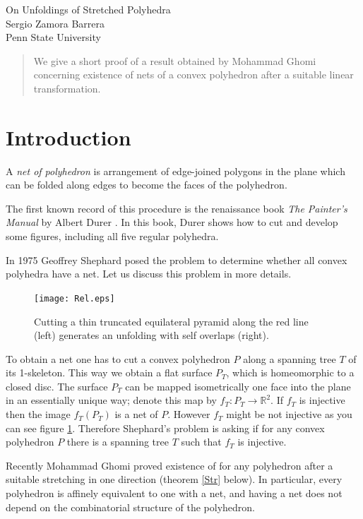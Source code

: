 \documentclass[openright, 12pt]{article}
\begin{document}
\begin{center}
\Large{On Unfoldings of Stretched Polyhedra}\\
\normalsize{ Sergio Zamora Barrera}\\
Penn State University
\end{center}



\begin{abstract}
\noindent We give a short proof of a result obtained by Mohammad Ghomi concerning existence of nets of a convex polyhedron after a suitable linear transformation.

\end{abstract}

\section{Introduction}

A \emph{net of polyhedron} is arrangement of edge-joined polygons in the plane which can be folded along edges to become the faces of the polyhedron.

The first known record of this procedure is the renaissance book \textit{The Painter's Manual} by Albert Durer \cite{Du}.
In this book, Durer shows how to cut and develop some figures, including all five regular polyhedra. 

In 1975 Geoffrey Shephard \cite{Sh} posed the problem to determine whether all convex polyhedra have a net.
Let us discuss this problem in more details.

\begin{figure}[h]
\centering
\texttt{[image: Rel.eps]}
\caption{Cutting a thin truncated equilateral pyramid along the red line (left) generates an unfolding with self overlaps (right).}\label{Tet}
\end{figure}

To obtain a net one has to cut a convex polyhedron $P$ along a spanning tree $T$ of its 1-skeleton.
This way we obtain a flat surface $P_T$, which is homeomorphic to a closed disc.
The surface $P_T$ can be mapped isometrically one face into the plane
in an essentially unique way; denote this map by $f_T\colon P_T\to \mathbb{R}^2$.
If $f_T$ is injective then the image $f_T(P_T)$ is a net of $P$.
However $f_T$ might be not injective as you can see figure \ref{Tet}.
Therefore Shephard's problem is asking if for any convex polyhedron $P$ there is a spanning tree $T$ such that $f_T$ is injective.


Recently Mohammad  Ghomi proved existence of for any polyhedron after a suitable stretching in one direction (theorem \ref{Str} below).
In particular, every polyhedron is affinely equivalent to one with a net, and having a net does not depend on the combinatorial structure of the polyhedron. 
\end{document}
